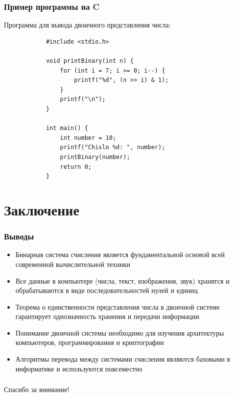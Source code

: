 \documentclass{beamer}
\begin{document}
	\begin{frame}[fragile]
		\frametitle{Пример программы на C}
		
		Программа для вывода двоичного представления числа:
		
		\vspace{0.2cm}
		
		\begin{lstlisting}
			#include <stdio.h>
			
			void printBinary(int n) {
				for (int i = 7; i >= 0; i--) {
					printf("%d", (n >> i) & 1);
				}
				printf("\n");
			}
			
			int main() {
				int number = 10;
				printf("Chislo %d: ", number);
				printBinary(number);
				return 0;
			}
		\end{lstlisting}
		
		
	\end{frame}
	
	\section{Заключение}
	
	\begin{frame}
		\frametitle{Выводы}
		
		\begin{itemize}
			\item Бинарная система счисления является фундаментальной основой всей современной вычислительной техники
			\pause
			\item Все данные в компьютере (числа, текст, изображения, звук) хранятся и обрабатываются в виде последовательностей нулей и единиц
			\pause
			\item Теорема о единственности представления числа в двоичной системе гарантирует однозначность хранения и передачи информации
			\pause
			\item Понимание двоичной системы необходимо для изучения архитектуры компьютеров, программирования и криптографии
			\pause
			\item Алгоритмы перевода между системами счисления являются базовыми в информатике и используются повсеместно
		\end{itemize}
		
	\end{frame}
	
	\begin{frame}
		\frametitle{}
		
		
		\begin{center}
			\Huge Спасибо за внимание!
		\end{center}
		
	\end{frame}
	
\end{document}
